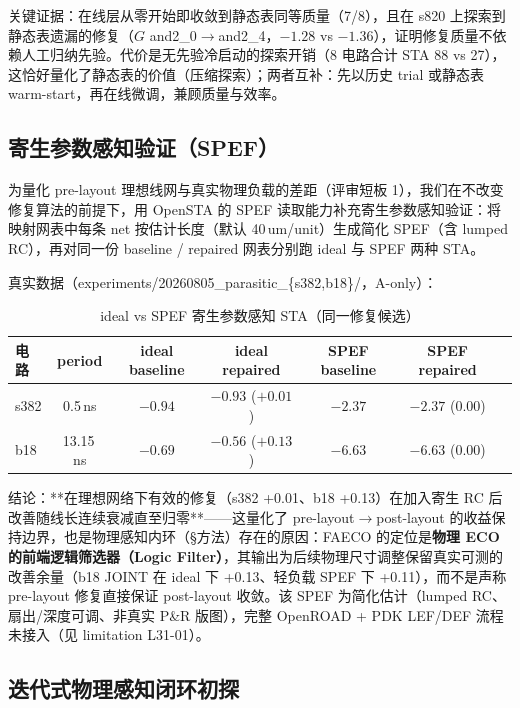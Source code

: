 \documentclass[journal]{IEEEtran}
\begin{document}
关键证据：在线层从零开始即收敛到静态表同等质量（7/8），且在 s820 上探索到静态表遗漏的修复（$G$ and2\_0$\rightarrow$and2\_4，$-1.28$ vs $-1.36$），证明修复质量不依赖人工归纳先验。代价是无先验冷启动的探索开销（8 电路合计 STA 88 vs 27），这恰好量化了静态表的价值（压缩探索）；两者互补：先以历史 trial 或静态表 warm-start，再在线微调，兼顾质量与效率。

\subsection{寄生参数感知验证（SPEF）}\label{sec:parasitic}

为量化 pre-layout 理想线网与真实物理负载的差距（评审短板 1），我们在不改变修复算法的前提下，用 OpenSTA 的 SPEF 读取能力补充寄生参数感知验证：将映射网表中每条 net 按估计长度（默认 40\,um/unit）生成简化 SPEF（含 lumped RC），再对同一份 baseline / repaired 网表分别跑 ideal 与 SPEF 两种 STA。

真实数据（experiments/20260805\_parasitic\_\{s382,b18\}/，A-only）：

\begin{table}[!t]
\centering
\caption{ideal vs SPEF 寄生参数感知 STA（同一修复候选）}
\label{tab:parasitic}
\scriptsize
\setlength{\tabcolsep}{3pt}
\begin{tabular}{lcccccc}
\toprule
电路 & period & ideal baseline & ideal repaired & SPEF baseline & SPEF repaired \\
\midrule
s382 & 0.5\,ns & $-0.94$ & $-0.93$ ($+0.01$) & $-2.37$ & $-2.37$ ($0.00$) \\
b18 & 13.15\,ns & $-0.69$ & $-0.56$ ($+0.13$) & $-6.63$ & $-6.63$ ($0.00$) \\
\bottomrule
\end{tabular}
\end{table}

结论：**在理想网络下有效的修复（s382 +0.01、b18 +0.13）在加入寄生 RC 后改善随线长连续衰减直至归零**——这量化了 pre-layout$\rightarrow$post-layout 的收益保持边界，也是物理感知内环（\S 方法）存在的原因：FAECO 的定位是\textbf{物理 ECO 的前端逻辑筛选器（Logic Filter）}，其输出为后续物理尺寸调整保留真实可测的改善余量（b18 JOINT 在 ideal 下 +0.13、轻负载 SPEF 下 +0.11），而不是声称 pre-layout 修复直接保证 post-layout 收敛。该 SPEF 为简化估计（lumped RC、扇出/深度可调、非真实 P\&R 版图），完整 OpenROAD + PDK LEF/DEF 流程未接入（见 limitation L31-01）。


\subsection{迭代式物理感知闭环初探}\label{sec:phys_closure}
\end{document}
